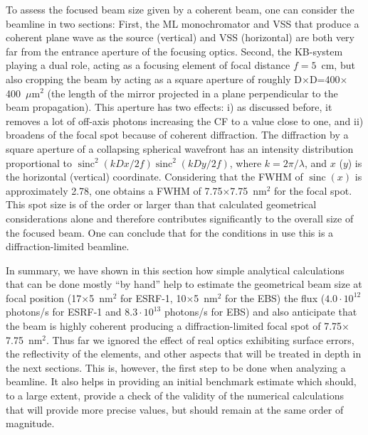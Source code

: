 \documentclass{iucr}              %
\newcommand{\todo}[1]{{\color{red}[TODO: "#1'']}}
\DeclareMathOperator{\sinc}{sinc}
\begin{document}
To assess the focused beam size given by a coherent beam, one can consider the beamline in two sections: First, the ML monochromator and VSS that produce a coherent plane wave as the source (vertical) and VSS (horizontal) are both very far from the entrance aperture of the focusing optics. Second, the KB-system playing a dual role, acting as a focusing element of focal distance $f=5$~cm, but also cropping the beam by acting as a square aperture of roughly D$\times$D=400$\times$400~$\mu$m$^2$ (the length of the mirror projected in a plane perpendicular to the beam propagation).
This aperture has two effects: i) as discussed before, it removes a lot of off-axis photons increasing the CF to a value close to one, and ii) broadens of the focal spot because of coherent diffraction. The diffraction by a square aperture of a collapsing spherical wavefront has an intensity distribution proportional to $\sinc^2(k D x/2 f) \sinc^2(k D y / 2 f)$,
where $k=2\pi/\lambda$, and $x$ ($y$) is the horizontal (vertical) coordinate. Considering that the FWHM of $\sinc(x)$ is approximately 2.78, one obtains a FWHM of 7.75$\times$7.75~nm$^2$ for the focal spot. This spot size is of the order or larger than that calculated geometrical considerations alone and therefore contributes significantly to the overall size of the focused beam. One can conclude that for the conditions in use this is a diffraction-limited beamline. 


In summary, we have shown in this section how simple analytical calculations that can be done mostly ``by hand'' help to estimate the geometrical beam size at focal position (17$\times$5~nm$^2$ for ESRF-1, 10$\times$5~nm$^2$ for the EBS) the flux ($4.0\cdot10^{12}$ photons/s for ESRF-1 and $8.3\cdot10^{13}$ photons/s for EBS) and also anticipate that the beam is highly coherent producing a diffraction-limited focal spot of  7.75$\times$7.75~nm$^2$. Thus far we ignored the effect of real optics exhibiting surface errors, the reflectivity of the elements, and other aspects that will be treated in depth in the next sections. This is, however, the first step to be done when analyzing a beamline. It also helps in providing an initial benchmark estimate which should, to a large extent, provide a check of the validity of the numerical calculations that will provide more precise values, but should remain at the same order of magnitude.  
\end{document}
